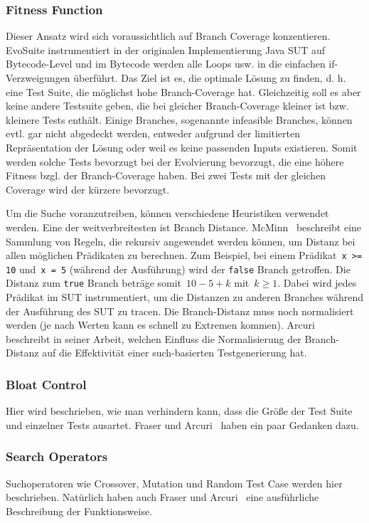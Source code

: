 \documentclass{article}
\begin{document}
\subsubsection{Fitness Function}
Dieser Ansatz wird sich voraussichtlich auf Branch Coverage konzentieren. EvoSuite instrumentiert in der originalen Implementierung Java SUT auf Bytecode-Level und im Bytecode werden alle Loops usw. in die einfachen if-Verzweigungen überführt. Das Ziel ist es, die optimale Lösung zu finden, d. h. eine Test Suite, die möglichst hohe Branch-Coverage hat. Gleichzeitig soll es aber keine andere Testsuite geben, die bei gleicher Branch-Coverage kleiner ist bzw. kleinere Tests enthält. Einige Branches, sogenannte infeasible Branches, können evtl. gar nicht abgedeckt werden, entweder aufgrund der limitierten Repräsentation der Lösung oder weil es keine passenden Inputs existieren. Somit werden solche Tests bevorzugt bei der Evolvierung bevorzugt, die eine höhere Fitness bzgl. der Branch-Coverage haben. Bei zwei Tests mit der gleichen Coverage wird der kürzere bevorzugt. 

Um die Suche voranzutreiben, können verschiedene Heuristiken verwendet werden.  Eine der weitverbreitesten ist Branch Distance. McMinn~\cite{McMinn_2004} beschreibt eine Sammlung von Regeln, die rekursiv angewendet werden können, um Distanz bei allen möglichen Prädikaten zu berechnen. Zum Beispiel, bei einem Prädikat~\lstinline{x >= 10} und~\lstinline{x = 5} (während der Ausführung) wird der \lstinline{false} Branch getroffen. Die Distanz zum \lstinline{true} Branch beträge somit~$10 - 5 + k$ mit~$k \geq 1$. Dabei wird jedes Prädikat im \ac{SUT} instrumentiert, um die Distanzen zu anderen Branches während der Ausführung des \ac{SUT} zu tracen. Die Branch-Distanz muss noch normalisiert werden (je nach Werten kann es schnell zu Extremen kommen). Arcuri~\cite{Arcuri_2011} beschreibt in seiner Arbeit, welchen Einfluss die Normalisierung der Branch-Distanz auf die Effektivität einer such-basierten Testgenerierung hat. 


\subsubsection{Bloat Control}
Hier wird beschrieben, wie man verhindern kann, dass die Größe der Test Suite und einzelner Tests ausartet. Fraser und Arcuri~\cite{Fraser_2011} haben ein paar Gedanken dazu. 

\subsubsection{Search Operators}
Suchoperatoren wie Crossover, Mutation und Random Test Case werden hier beschrieben. Natürlich haben auch Fraser und Arcuri~\cite{Fraser_2011} eine ausführliche Beschreibung der Funktionsweise. 
\end{document}
